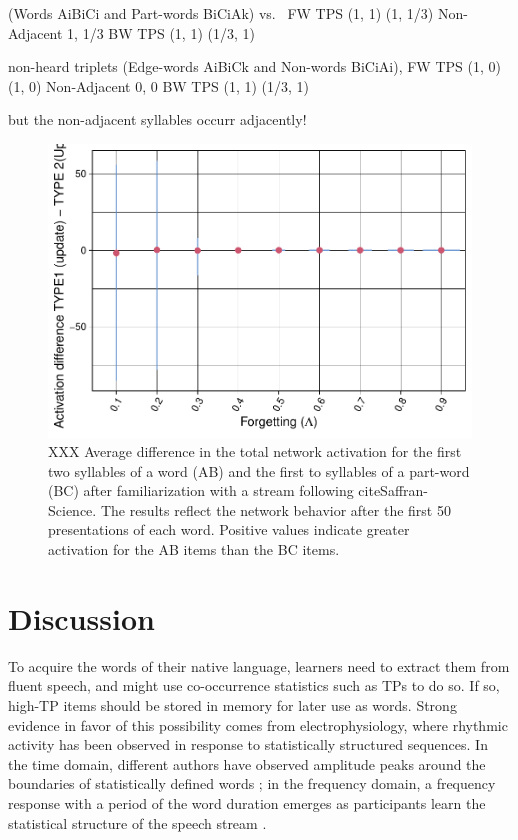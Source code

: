 \documentclass[
]{article}
\begin{document}
(Words AiBiCi and Part-words BiCiAk) vs.~ FW TPS (1, 1) (1, 1/3)
Non-Adjacent 1, 1/3 BW TPS (1, 1) (1/3, 1)

non-heard triplets (Edge-words AiBiCk and Non-words BiCiAi), FW TPS (1,
0) (1, 0) Non-Adjacent 0, 0 BW TPS (1, 1) (1/3, 1)

but the non-adjacent syllables occurr adjacently!

\begin{figure}
\includegraphics[width=1\linewidth]{tp_model_entrainment_files/figure-latex/basic-experiment-global-print-act-3syll-flo-plot-1} \caption{XXX Average difference in the total network activation for the first two syllables of a word (AB) and the first to syllables of a part-word (BC) after familiarization with a stream following cite{Saffran-Science}. The results reflect the network behavior after the first 50 presentations of each word. Positive values indicate greater activation for the AB items than the BC items.}\label{fig:basic-experiment-global-print-act-3syll-flo-plot}
\end{figure}

\clearpage

\hypertarget{discussion}{%
\section{Discussion}\label{discussion}}

To acquire the words of their native language, learners need to extract
them from fluent speech, and might use co-occurrence statistics such as
TPs to do so. If so, high-TP items should be stored in memory for later
use as words. Strong evidence in favor of this possibility comes from
electrophysiology, where rhythmic activity has been observed in response
to statistically structured sequences. In the time domain, different
authors have observed amplitude peaks around the boundaries of
statistically defined words
\citep{Abla2008, Cunillera2006, Kudo2011, Sanders2002, Teinonen2009}; in
the frequency domain, a frequency response with a period of the word
duration emerges as participants learn the statistical structure of the
speech stream
\citep{Buiatti2009, Batterink2017, Flo2022, Kabdebon2015, Moreau2022, Moser2021}.
\end{document}
